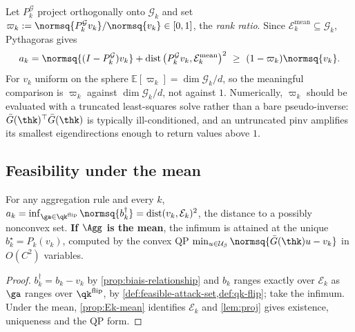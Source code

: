 \begin{remark}
\label{rem:rank}
Let $P^{\mathcal{G}}_k$ project orthogonally onto $\mathcal{G}_k$ and set
$\varpi_k:=\normsq{P^{\mathcal{G}}_kv_k}/\normsq{v_k}\in[0,1]$, the \emph{rank ratio}. Since
$\mathcal{E}_k^{\mathrm{mean}}\subseteq\mathcal{G}_k$, Pythagoras gives
\begin{equation}
a_k=\normsq{(I-P^{\mathcal{G}}_k)v_k}+\operatorname{dist}\big(P^{\mathcal{G}}_kv_k,\mathcal{E}_k^{\mathrm{mean}}\big)^2\ \ge\ (1-\varpi_k)\normsq{v_k}.
\label{eq:rank-ceiling}
\end{equation}
For $v_k$ uniform on the sphere $\mathbb{E}[\varpi_k]=\dim\mathcal{G}_k/d$, so the meaningful
comparison is $\varpi_k$ against $\dim\mathcal{G}_k/d$, not against $1$. Numerically, $\varpi_k$
should be evaluated with a truncated least-squares solve rather than a bare pseudo-inverse:
$\bar G(\thk)^\top\bar G(\thk)$ is typically ill-conditioned, and an untruncated $\mathrm{pinv}$
amplifies its smallest eigendirections enough to return values above $1$.
\end{remark}


\subsection{Feasibility under the mean}
\label{sec:feas-mean}

\begin{proposition}
\label{prop:ak-dist}
For any aggregation rule and every $k$,
$a_k=\inf_{\ga\in\qk^{\mathrm{flip}}}\normsq{b_k^\dagger}=\operatorname{dist}(v_k,\mathcal{E}_k)^2$,
the distance to a possibly nonconvex set. \textbf{If $\Agg$ is the mean}, the infimum is attained
at the unique $b_k^\star=P_k(v_k)$, computed by the convex QP
$\min_{u\in\mathcal{U}_\beta}\normsq{\bar G(\thk)u-v_k}$ in $O(C^2)$ variables.
\end{proposition}
\begin{proof}
$b_k^\dagger=b_k-v_k$ by \cref{prop:biais-relationship} and $b_k$ ranges exactly over
$\mathcal{E}_k$ as $\ga$ ranges over $\qk^{\mathrm{flip}}$, by
\cref{def:feasible-attack-set,def:qk-flip}; take the infimum. Under the mean,
\cref{prop:Ek-mean} identifies $\mathcal{E}_k$ and \cref{lem:proj} gives existence, uniqueness
and the QP form.
\end{proof}

